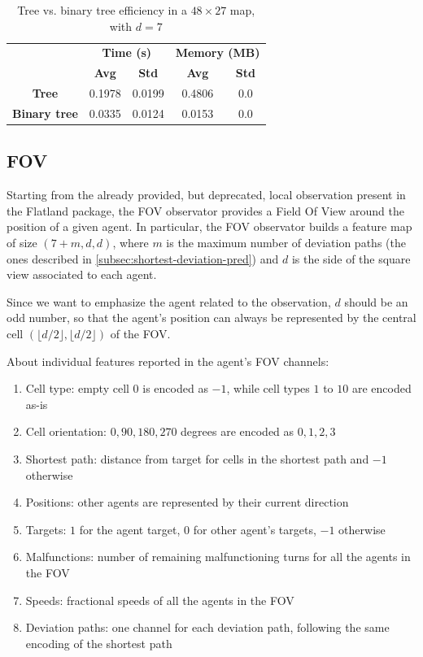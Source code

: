 \documentclass[a4paper,10pt]{report}
\begin{document}
\begin{table}[h]
	\center
	\begin{tabular}{||c c c c c||}
		\hline
					& \multicolumn{2}{c}{\textbf{Time (s)}} & \multicolumn{2}{c||}{\textbf{Memory (MB)}} \\  [0.5ex]
					& \textbf{Avg}         & \textbf{Std}        & \textbf{Avg}          & \textbf{Std} \\  [0.5ex]
		\hline\hline
		\textbf{Tree} & 0.1978 & 0.0199 & 0.4806 & 0.0 \\
		\hline
		\textbf{Binary tree} & 0.0335 & 0.0124 & 0.0153 & 0.0 \\
		\hline       
	\end{tabular}
	\caption{Tree vs. binary tree efficiency in a $48\times 27$ map, with $d=7$}
	\label{table:tree-bt-48x27}
\end{table}

\subsection{FOV}\label{subsec:fov-obs}
Starting from the already provided, but deprecated, local observation present in the Flatland package, the FOV observator provides a Field Of View around the position of a given agent. In particular, the FOV observator builds a feature map of size $(7 + m, d, d)$, where $m$ is the maximum number of deviation paths (the ones described in \ref{subsec:shortest-deviation-pred}) and $d$ is the side of the square view associated to each agent.

Since we want to emphasize the agent related to the observation, $d$ should be an odd number, so that the agent's position can always be represented by the central cell $(\lfloor d / 2 \rfloor, \lfloor d / 2 \rfloor)$ of the FOV.

About individual features reported in the agent's FOV channels:
\begin{enumerate}
	\item Cell type: empty cell $0$ is encoded as $-1$, while cell types $1$ to $10$ are encoded as-is
	\item Cell orientation: $0, 90, 180, 270$ degrees are encoded as $0, 1, 2, 3$
	\item Shortest path: distance from target for cells in the shortest path and $-1$ otherwise
	\item Positions: other agents are represented by their current direction
	\item Targets: $1$ for the agent target, $0$ for other agent's targets, $-1$ otherwise
	\item Malfunctions: number of remaining malfunctioning turns for all the agents in the FOV
	\item Speeds: fractional speeds of all the agents in the FOV
	\item Deviation paths: one channel for each deviation path, following the same encoding of the shortest path
\end{enumerate}
\end{document}
